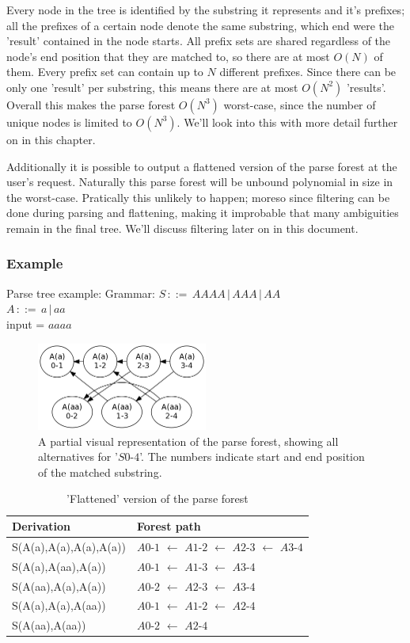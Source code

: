 \documentclass[a4paper,10pt]{article}
\begin{document}
Every node in the tree is identified by the substring it represents and it's prefixes; all the prefixes of a certain node denote the same substring, which end were the 'result' contained in the node starts. All prefix sets are shared regardless of the node's end position that they are matched to, so there are at most $O(N)$ of them. Every prefix set can contain up to $N$ different prefixes. Since there can be only one 'result' per substring, this means there are at most $O(N^{2})$ 'results'. Overall this makes the parse forest $O(N^{3})$ worst-case, since the number of unique nodes is limited to $O(N^{3})$. We'll look into this with more detail further on in this chapter.

Additionally it is possible to output a flattened version of the parse forest at the user's request. Naturally this parse forest will be unbound polynomial in size in the worst-case. Pratically this unlikely to happen; moreso since filtering can be done during parsing and flattening, making it improbable that many ambiguities remain in the final tree. We'll discuss filtering later on in this document.

\subsubsection{Example}

Parse tree example:
Grammar:
$S\,::=\,AAAA\,|\,AAA\,|\,AA$\\
$A\,::=\,a\,|\,aa$\\
input = $aaaa$

\begin{figure}[H]
\centering
\includegraphics[width=0.5\textwidth]{a_aa-forest.png}
\caption{A partial visual representation of the parse forest, showing all alternatives for '$S0$-$4$'. The numbers indicate start and end position of the matched substring.}
\end{figure}

\begin{table}[H]
\centering
\begin{tabular}{ p{15em} p{15em} }
Derivation & Forest path\\
\hline
S(A(a),A(a),A(a),A(a)) & $A0$-$1$ $\leftarrow$ $A1$-$2$ $\leftarrow$ $A2$-$3$ $\leftarrow$ $A3$-$4$\\
S(A(a),A(aa),A(a)) & $A0$-$1$ $\leftarrow$ $A1$-$3$ $\leftarrow$ $A3$-$4$\\
S(A(aa),A(a),A(a)) & $A0$-$2$ $\leftarrow$ $A2$-$3$ $\leftarrow$ $A3$-$4$\\
S(A(a),A(a),A(aa)) & $A0$-$1$ $\leftarrow$ $A1$-$2$ $\leftarrow$ $A2$-$4$\\
S(A(aa),A(aa)) & $A0$-$2$ $\leftarrow$ $A2$-$4$
\end{tabular}
\caption{'Flattened' version of the parse forest}
\end{table}
\end{document}

